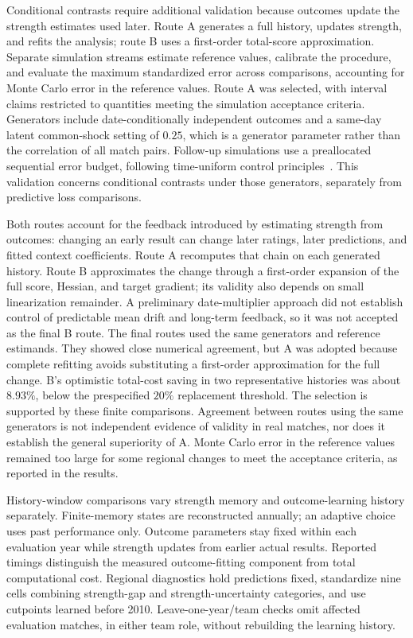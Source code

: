 Conditional contrasts require additional validation because outcomes update the strength estimates used later. Route A generates a full history, updates strength, and refits the analysis; route B uses a first-order total-score approximation. Separate simulation streams estimate reference values, calibrate the procedure, and evaluate the maximum standardized error across comparisons, accounting for Monte Carlo error in the reference values. Route A was selected, with interval claims restricted to quantities meeting the simulation acceptance criteria. Generators include date-conditionally independent outcomes and a same-day latent common-shock setting of $0.25$, which is a generator parameter rather than the correlation of all match pairs. Follow-up simulations use a preallocated sequential error budget, following time-uniform control principles~\cite{howard2021confidence}. This validation concerns conditional contrasts under those generators, separately from predictive loss comparisons.

Both routes account for the feedback introduced by estimating strength from outcomes: changing an early result can change later ratings, later predictions, and fitted context coefficients. Route A recomputes that chain on each generated history. Route B approximates the change through a first-order expansion of the full score, Hessian, and target gradient; its validity also depends on small linearization remainder. A preliminary date-multiplier approach did not establish control of predictable mean drift and long-term feedback, so it was not accepted as the final B route. The final routes used the same generators and reference estimands. They showed close numerical agreement, but A was adopted because complete refitting avoids substituting a first-order approximation for the full change. B's optimistic total-cost saving in two representative histories was about $8.93\%$, below the prespecified $20\%$ replacement threshold. The selection is supported by these finite comparisons. Agreement between routes using the same generators is not independent evidence of validity in real matches, nor does it establish the general superiority of A. Monte Carlo error in the reference values remained too large for some regional changes to meet the acceptance criteria, as reported in the results.

History-window comparisons vary strength memory and outcome-learning history separately. Finite-memory states are reconstructed annually; an adaptive choice uses past performance only. Outcome parameters stay fixed within each evaluation year while strength updates from earlier actual results. Reported timings distinguish the measured outcome-fitting component from total computational cost. Regional diagnostics hold predictions fixed, standardize nine cells combining strength-gap and strength-uncertainty categories, and use cutpoints learned before 2010. Leave-one-year/team checks omit affected evaluation matches, in either team role, without rebuilding the learning history.

